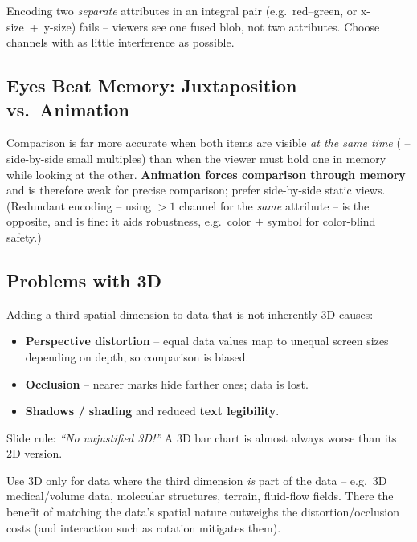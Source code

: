 \begin{pitfall}
Encoding two \emph{separate} attributes in an integral pair (e.g.\
red--green, or x-size~+~y-size) fails -- viewers see one fused blob, not two
attributes. Choose channels with as little interference as possible.
\end{pitfall}

\subsection{Eyes Beat Memory: Juxtaposition vs.\ Animation}

\begin{keybox}
Comparison is far more accurate when both items are visible \emph{at the same
time} (\term{juxtaposition} -- side-by-side small multiples) than when the
viewer must hold one in memory while looking at the other. \textbf{Animation
forces comparison through memory} and is therefore weak for precise comparison;
prefer side-by-side static views. (Redundant encoding -- using $>1$ channel for
the \emph{same} attribute -- is the opposite, and is fine: it aids robustness,
e.g.\ color $+$ symbol for color-blind safety.)
\end{keybox}

\subsection{Problems with 3D}

\begin{pitfall}[Unjustified 3D]
Adding a third spatial dimension to data that is not inherently 3D causes:
\begin{itemize}
  \item \textbf{Perspective distortion} -- equal data values map to unequal
    screen sizes depending on depth, so comparison is biased.
  \item \textbf{Occlusion} -- nearer marks hide farther ones; data is lost.
  \item \textbf{Shadows / shading} and reduced \textbf{text legibility}.
\end{itemize}
Slide rule: \emph{``No unjustified 3D!''} A 3D bar chart is almost always worse
than its 2D version.
\end{pitfall}

\begin{keybox}
Use 3D only for  data where the third dimension
\emph{is} part of the data -- e.g.\ 3D medical/volume data, molecular
structures, terrain, fluid-flow fields. There the benefit of matching the data's
spatial nature outweighs the distortion/occlusion costs (and interaction such
as rotation mitigates them).
\end{keybox}

